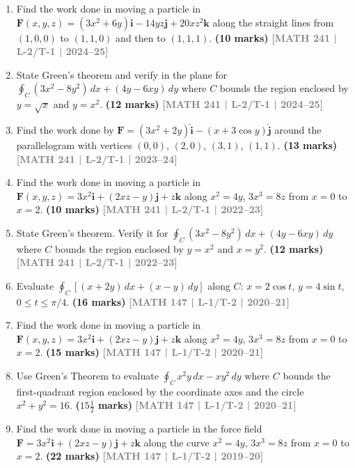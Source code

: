 \documentclass[12pt,a4paper]{article}
\newcommand{\yr}[1]{\hfill\textcolor{gray}{\small\textbf{[#1]}}}
\newcommand{\mk}[1]{\textcolor{orange!70!black}{\small\textbf{(#1 marks)}}}
\begin{document}
\begin{enumerate}\item Find the work done in moving a particle in $\mathbf{F}(x,y,z)=(3x^{2}+6y)\mathbf{i}-14yz\mathbf{j}+20xz^{2}\mathbf{k}$ along the straight lines from $(1,0,0)$ to $(1,1,0)$ and then to $(1,1,1)$.
\mk{10} \yr{MATH 241 | L-2/T-1 | 2024--25}

\item State Green's theorem and verify in the plane for $\displaystyle\oint_{C}(3x^{2}-8y^{2})\,dx+(4y-6xy)\,dy$ where $C$ bounds the region enclosed by $y=\sqrt{x}$ and $y=x^{2}$.
\mk{12} \yr{MATH 241 | L-2/T-1 | 2024--25}

\item Find the work done by $\mathbf{F}=(3x^{2}+2y)\hat{\mathbf{i}}-(x+3\cos y)\hat{\mathbf{j}}$ around the parallelogram with vertices $(0,0)$, $(2,0)$, $(3,1)$, $(1,1)$.
\mk{13} \yr{MATH 241 | L-2/T-1 | 2023--24}

\item Find the work done in moving a particle in $\mathbf{F}(x,y,z)=3x^{2}\mathbf{i}+(2xz-y)\mathbf{j}+z\mathbf{k}$ along $x^{2}=4y$, $3x^{3}=8z$ from $x=0$ to $x=2$.
\mk{10} \yr{MATH 241 | L-2/T-1 | 2022--23}

\item State Green's theorem. Verify it for $\displaystyle\oint_{C}(3x^{2}-8y^{2})\,dx+(4y-6xy)\,dy$ where $C$ bounds the region enclosed by $y=x^{2}$ and $x=y^{2}$.
\mk{12} \yr{MATH 241 | L-2/T-1 | 2022--23}

\item Evaluate $\displaystyle\oint_{C}[(x+2y)\,dx+(x-y)\,dy]$ along $C$: $x=2\cos t$, $y=4\sin t$, $0\le t\le\pi/4$.
\mk{16} \yr{MATH 147 | L-1/T-2 | 2020--21}

\item Find the work done in moving a particle in $\mathbf{F}(x,y,z)=3x^{2}\mathbf{i}+(2xz-y)\mathbf{j}+z\mathbf{k}$ along $x^{2}=4y$, $3x^{3}=8z$ from $x=0$ to $x=2$.
\mk{15} \yr{MATH 147 | L-1/T-2 | 2020--21}

\item Use Green's Theorem to evaluate $\displaystyle\oint_{C}x^{2}y\,dx-xy^{2}\,dy$ where $C$ bounds the first-quadrant region enclosed by the coordinate axes and the circle $x^{2}+y^{2}=16$.
\mk{$15\tfrac{1}{2}$} \yr{MATH 147 | L-1/T-2 | 2020--21}

\item Find the work done in moving a particle in the force field $\mathbf{F}=3x^{2}\mathbf{i}+(2xz-y)\mathbf{j}+z\mathbf{k}$ along the curve $x^{2}=4y$, $3x^{3}=8z$ from $x=0$ to $x=2$.
\mk{22} \yr{MATH 147 | L-1/T-2 | 2019--20}


\end{enumerate}
\end{document}
